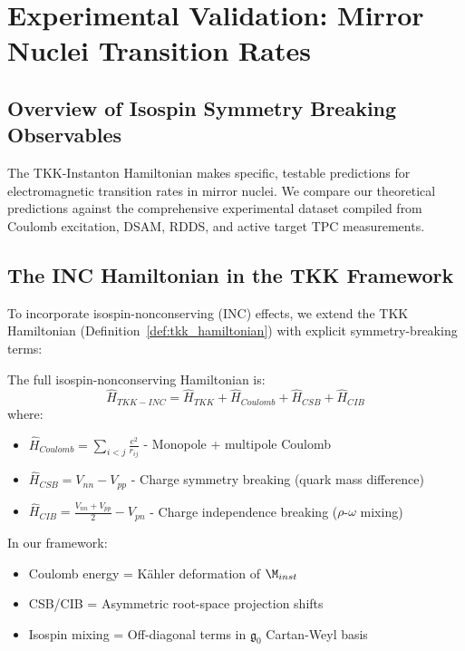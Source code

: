 \section{Experimental Validation: Mirror Nuclei Transition Rates}

\subsection{Overview of Isospin Symmetry Breaking Observables}

The TKK-Instanton Hamiltonian makes specific, testable predictions for electromagnetic transition rates in mirror nuclei. We compare our theoretical predictions against the comprehensive experimental dataset compiled from Coulomb excitation, DSAM, RDDS, and active target TPC measurements.

\subsection{The INC Hamiltonian in the TKK Framework}

To incorporate isospin-nonconserving (INC) effects, we extend the TKK Hamiltonian (Definition~\ref{def:tkk_hamiltonian}) with explicit symmetry-breaking terms:

\begin{definition}\label{def:tkk_inc}
The full isospin-nonconserving Hamiltonian is:
\begin{equation}
\hat{H}_{TKK-INC} = \hat{H}_{TKK} + \hat{H}_{Coulomb} + \hat{H}_{CSB} + \hat{H}_{CIB}
\end{equation}
where:
\begin{itemize}
    \item $\hat{H}_{Coulomb} = \sum_{i<j} \frac{e^2}{r_{ij}}$ - Monopole + multipole Coulomb
    \item $\hat{H}_{CSB} = V_{nn} - V_{pp}$ - Charge symmetry breaking (quark mass difference)
    \item $\hat{H}_{CIB} = \frac{V_{nn} + V_{pp}}{2} - V_{pn}$ - Charge independence breaking ($\rho$-$\omega$ mixing)
\end{itemize}
\end{definition}

\begin{remark}
In our framework:
\begin{itemize}
    \item Coulomb energy = Kähler deformation of $\M_{inst}$
    \item CSB/CIB = Asymmetric root-space projection shifts
    \item Isospin mixing = Off-diagonal terms in $\mathfrak{g}_0$ Cartan-Weyl basis
\end{itemize}
\end{remark}

